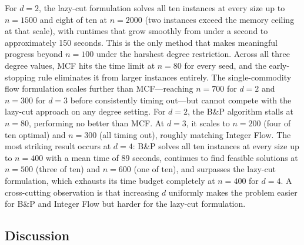 \documentclass[12pt]{article}
\begin{document}
For $d = 2$, the lazy-cut formulation solves all ten instances at every size up to $n = 1500$ and eight of ten at $n = 2000$ (two instances exceed the memory ceiling at that scale), with runtimes that grow smoothly from under a second to approximately 150 seconds. This is the only method that makes meaningful progress beyond $n = 100$ under the harshest degree restriction. Across all three degree values, MCF hits the time limit at $n = 80$ for every seed, and the early-stopping rule eliminates it from larger instances entirely. The single-commodity flow formulation scales further than MCF—reaching $n = 700$ for $d = 2$ and $n = 300$ for $d = 3$ before consistently timing out—but cannot compete with the lazy-cut approach on any degree setting. For $d = 2$, the B\&P algorithm stalls at $n = 80$, performing no better than MCF. At $d = 3$, it scales to $n = 200$ (four of ten optimal) and $n = 300$ (all timing out), roughly matching Integer Flow. The most striking result occurs at $d = 4$: B\&P solves all ten instances at every size up to $n = 400$ with a mean time of 89 seconds, continues to find feasible solutions at $n = 500$ (three of ten) and $n = 600$ (one of ten), and surpasses the lazy-cut formulation, which exhausts its time budget completely at $n = 400$ for $d = 4$. A cross-cutting observation is that increasing $d$ uniformly makes the problem easier for B\&P and Integer Flow but harder for the lazy-cut formulation.

\subsection{Discussion}
\end{document}

